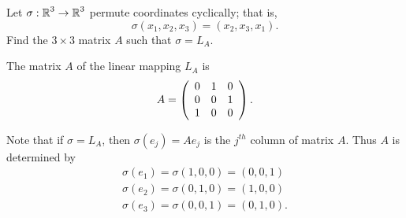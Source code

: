 \documentclass{ximera}
\begin{document}
\begin{exercise} \label{c4.3.10}
Let $\sigma:\mbox{$\Bbb{R}$}^3\to\mbox{$\Bbb{R}$}^3$ permute coordinates cyclically; that is,
\[
\sigma(x_1,x_2,x_3) = (x_2,x_3,x_1).
\]
Find the $3\times 3$ matrix $A$ such that $\sigma = L_A$.

\begin{solution}

\ans The matrix $A$ of the linear mapping $L_A$ is
\[ 
A = \left(\begin{array}{rrr} 0 & 1 & 0 \\ 0 & 0 & 1 \\ 1 & 0 & 0\end{array}\right). 
\]

\soln Note that if $\sigma = L_A$, then $\sigma(e_j) = Ae_j$ is the
$j^{th}$ column of matrix $A$.  Thus $A$ is determined by
\[
\begin{array}{l}
\sigma(e_1) = \sigma(1,0,0) = (0,0,1) \\
\sigma(e_2) = \sigma(0,1,0) = (1,0,0) \\
\sigma(e_3) = \sigma(0,0,1) = (0,1,0). \end{array}
\]


\end{solution}
\end{exercise}
\end{document}

